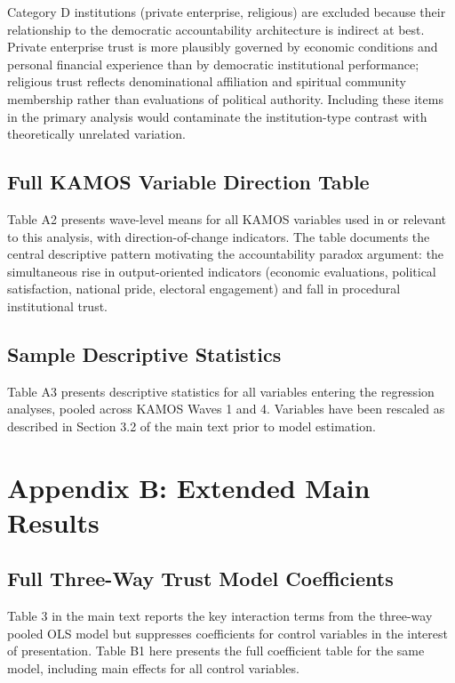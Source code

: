 \documentclass[
  12pt,
  letterpaper]{article}
\begin{document}
Category D institutions (private enterprise, religious) are excluded
because their relationship to the democratic accountability architecture
is indirect at best. Private enterprise trust is more plausibly governed
by economic conditions and personal financial experience than by
democratic institutional performance; religious trust reflects
denominational affiliation and spiritual community membership rather
than evaluations of political authority. Including these items in the
primary analysis would contaminate the institution-type contrast with
theoretically unrelated variation.

\subsection{Full KAMOS Variable Direction
Table}\label{sec-direction-table}

Table A2 presents wave-level means for all KAMOS variables used in or
relevant to this analysis, with direction-of-change indicators. The
table documents the central descriptive pattern motivating the
accountability paradox argument: the simultaneous rise in
output-oriented indicators (economic evaluations, political
satisfaction, national pride, electoral engagement) and fall in
procedural institutional trust.

\subsection{Sample Descriptive Statistics}\label{sec-descriptives}

Table A3 presents descriptive statistics for all variables entering the
regression analyses, pooled across KAMOS Waves 1 and 4. Variables have
been rescaled as described in Section 3.2 of the main text prior to
model estimation.

\section{Appendix B: Extended Main Results}\label{sec-main-results}

\subsection{Full Three-Way Trust Model
Coefficients}\label{sec-full-threeway}

Table 3 in the main text reports the key interaction terms from the
three-way pooled OLS model but suppresses coefficients for control
variables in the interest of presentation. Table B1 here presents the
full coefficient table for the same model, including main effects for
all control variables.
\end{document}
